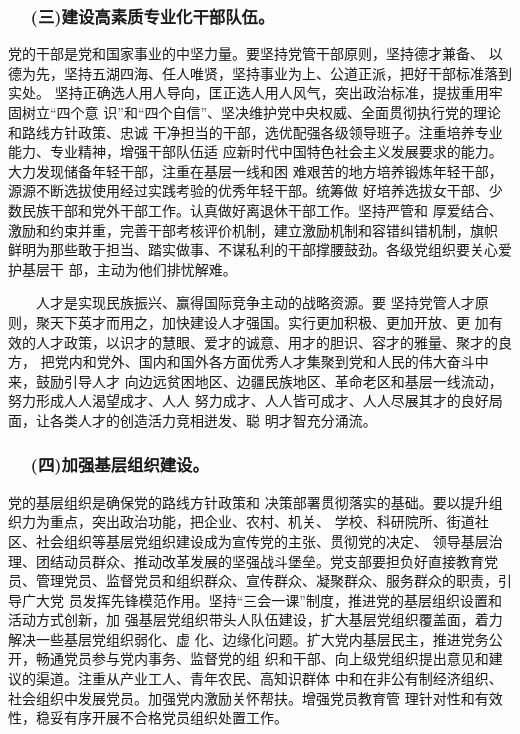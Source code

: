 \documentclass[11pt]{ctexart}
\begin{document}
{{{{\subsubsection{　 (三)建设高素质专业化干部队伍。}
\label{sec:org1cfee6d}

党的干部是党和国家事业的中坚力量。要坚持党管干部原则，坚持德才兼备、
以德为先，坚持五湖四海、任人唯贤，坚持事业为上、公道正派，把好干部标准落到实处。
坚持正确选人用人导向，匡正选人用人风气，突出政治标准，提拔重用牢固树立“四个意
识”和“四个自信”、坚决维护党中央权威、全面贯彻执行党的理论和路线方针政策、忠诚
干净担当的干部，选优配强各级领导班子。注重培养专业能力、专业精神，增强干部队伍适
应新时代中国特色社会主义发展要求的能力。大力发现储备年轻干部，注重在基层一线和困
难艰苦的地方培养锻炼年轻干部，源源不断选拔使用经过实践考验的优秀年轻干部。统筹做
好培养选拔女干部、少数民族干部和党外干部工作。认真做好离退休干部工作。坚持严管和
厚爱结合、激励和约束并重，完善干部考核评价机制，建立激励机制和容错纠错机制，旗帜
鲜明为那些敢于担当、踏实做事、不谋私利的干部撑腰鼓劲。各级党组织要关心爱护基层干
部，主动为他们排忧解难。

　　人才是实现民族振兴、赢得国际竞争主动的战略资源。要
坚持党管人才原则，聚天下英才而用之，加快建设人才强国。实行更加积极、更加开放、更
加有效的人才政策，以识才的慧眼、爱才的诚意、用才的胆识、容才的雅量、聚才的良方，
把党内和党外、国内和国外各方面优秀人才集聚到党和人民的伟大奋斗中来，鼓励引导人才
向边远贫困地区、边疆民族地区、革命老区和基层一线流动，努力形成人人渴望成才、人人
努力成才、人人皆可成才、人人尽展其才的良好局面，让各类人才的创造活力竞相迸发、聪
明才智充分涌流。

\subsubsection{　 (四)加强基层组织建设。}
\label{sec:orgf4996ed}

党的基层组织是确保党的路线方针政策和
决策部署贯彻落实的基础。要以提升组织力为重点，突出政治功能，把企业、农村、机关、
学校、科研院所、街道社区、社会组织等基层党组织建设成为宣传党的主张、贯彻党的决定、
领导基层治理、团结动员群众、推动改革发展的坚强战斗堡垒。党支部要担负好直接教育党
员、管理党员、监督党员和组织群众、宣传群众、凝聚群众、服务群众的职责，引导广大党
员发挥先锋模范作用。坚持“三会一课”制度，推进党的基层组织设置和活动方式创新，加
强基层党组织带头人队伍建设，扩大基层党组织覆盖面，着力解决一些基层党组织弱化、虚
化、边缘化问题。扩大党内基层民主，推进党务公开，畅通党员参与党内事务、监督党的组
织和干部、向上级党组织提出意见和建议的渠道。注重从产业工人、青年农民、高知识群体
中和在非公有制经济组织、社会组织中发展党员。加强党内激励关怀帮扶。增强党员教育管
理针对性和有效性，稳妥有序开展不合格党员组织处置工作。

}}}}
\end{document}
